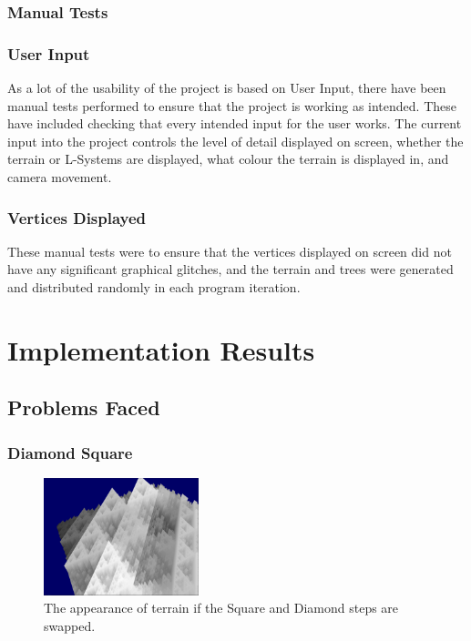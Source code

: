 \documentclass[a4paper,10pt]{report}
\begin{document}
\subsection{Manual Tests}

\subsection{User Input}

As a lot of the usability of the project is based on User Input, there have been manual tests performed to ensure that the project is working as intended. These have included checking that every intended input for the user works. The current input into the project controls the level of detail displayed on screen, whether the terrain or L-Systems are displayed, what colour the terrain is displayed in, and camera movement.

\subsection{Vertices Displayed}

These manual tests were to ensure that the vertices displayed on screen did not have any significant graphical glitches, and the terrain and trees were generated and distributed randomly in each program iteration.

\chapter{Implementation Results}
\section{Problems Faced}
\subsection{Diamond Square}

\begin{figure}[h!]
    \centering
  \includegraphics[width=0.4\textwidth]{Images/Screenshots/Glitch.png}
 \caption{The appearance of terrain if the Square and Diamond steps are swapped.}
 \label{fig:glitch}
\end{figure}
\end{document}
